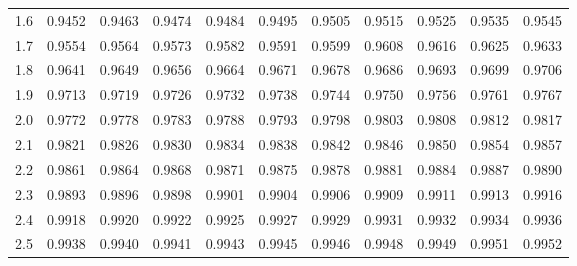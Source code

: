 \begin{table}[p]
\begin{center}
{\begin{tabular}{c | rrrrr | rrrrr |}
  1.6 & \scriptsize{0.9452} & \scriptsize{0.9463} & \scriptsize{0.9474} & \scriptsize{0.9484} & \scriptsize{0.9495} & \scriptsize{0.9505} & \scriptsize{0.9515} & \scriptsize{0.9525} & \scriptsize{0.9535} & \scriptsize{0.9545} \\
  1.7 & \scriptsize{0.9554} & \scriptsize{0.9564} & \scriptsize{0.9573} & \scriptsize{0.9582} & \scriptsize{0.9591} & \scriptsize{0.9599} & \scriptsize{0.9608} & \scriptsize{0.9616} & \scriptsize{0.9625} & \scriptsize{0.9633} \\
  1.8 & \scriptsize{0.9641} & \scriptsize{0.9649} & \scriptsize{0.9656} & \scriptsize{0.9664} & \scriptsize{0.9671} & \scriptsize{0.9678} & \scriptsize{0.9686} & \scriptsize{0.9693} & \scriptsize{0.9699} & \scriptsize{0.9706} \\
  1.9 & \scriptsize{0.9713} & \scriptsize{0.9719} & \scriptsize{0.9726} & \scriptsize{0.9732} & \scriptsize{0.9738} & \scriptsize{0.9744} & \scriptsize{0.9750} & \scriptsize{0.9756} & \scriptsize{0.9761} & \scriptsize{0.9767} \\
  \hline
  \hline
  2.0 & \scriptsize{0.9772} & \scriptsize{0.9778} & \scriptsize{0.9783} & \scriptsize{0.9788} & \scriptsize{0.9793} & \scriptsize{0.9798} & \scriptsize{0.9803} & \scriptsize{0.9808} & \scriptsize{0.9812} & \scriptsize{0.9817} \\
  2.1 & \scriptsize{0.9821} & \scriptsize{0.9826} & \scriptsize{0.9830} & \scriptsize{0.9834} & \scriptsize{0.9838} & \scriptsize{0.9842} & \scriptsize{0.9846} & \scriptsize{0.9850} & \scriptsize{0.9854} & \scriptsize{0.9857} \\
  2.2 & \scriptsize{0.9861} & \scriptsize{0.9864} & \scriptsize{0.9868} & \scriptsize{0.9871} & \scriptsize{0.9875} & \scriptsize{0.9878} & \scriptsize{0.9881} & \scriptsize{0.9884} & \scriptsize{0.9887} & \scriptsize{0.9890} \\
  2.3 & \scriptsize{0.9893} & \scriptsize{0.9896} & \scriptsize{0.9898} & \scriptsize{0.9901} & \scriptsize{0.9904} & \scriptsize{0.9906} & \scriptsize{0.9909} & \scriptsize{0.9911} & \scriptsize{0.9913} & \scriptsize{0.9916} \\
  2.4 & \scriptsize{0.9918} & \scriptsize{0.9920} & \scriptsize{0.9922} & \scriptsize{0.9925} & \scriptsize{0.9927} & \scriptsize{0.9929} & \scriptsize{0.9931} & \scriptsize{0.9932} & \scriptsize{0.9934} & \scriptsize{0.9936} \\
  \hline
  2.5 & \scriptsize{0.9938} & \scriptsize{0.9940} & \scriptsize{0.9941} & \scriptsize{0.9943} & \scriptsize{0.9945} & \scriptsize{0.9946} & \scriptsize{0.9948} & \scriptsize{0.9949} & \scriptsize{0.9951} & \scriptsize{0.9952} \\

\end{tabular}}
\end{center}
\end{table}
